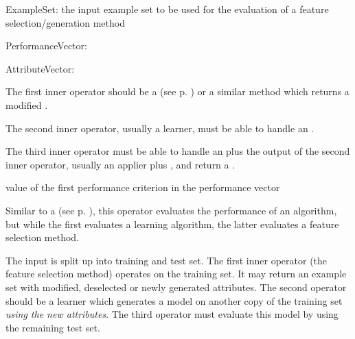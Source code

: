 



\newcommand{\methodvalidationdata}{
\begin{opin}
\item[ExampleSet:] the input example set to be used for the evaluation of a feature selection/generation method
\end{opin}

\begin{opout}
\item[PerformanceVector:]
\item[AttributeVector:]
\end{opout}

\begin{innerops}
\item The first inner operator should be a \op{FeatureOperator} 
(see p. \pageref{sec:op:FeatureOperator}) or a similar method
  which returns a modified \ioobj{ExampleSet}.
\item The second inner operator, usually a learner, must be able to handle an \ioobj{ExampleSet}.
\item The third inner operator must be able to handle an \ioobj{ExampleSet} plus the output of
  the second inner operator, usually an applier plus , and return a .
\end{innerops}
}
\methodvalidationdata

\newcommand{\methodvalidationchainvalues}{
\val[performance] value of the first performance criterion in the
  performance vector
}
\begin{values}
\methodvalidationchainvalues
\end{values}

\opdescr Similar to a  (see p. \pageref{sec:op:ValidationChain}), 
this operator evaluates the performance of an algorithm, 
but while the first evaluates a learning algorithm, 
the latter evaluates a feature selection method. 

The input  is split up into training and test
set. The first inner operator (the feature selection method) operates
on the training set. It may return an example set with modified,
deselected or newly generated attributes. The second operator should
be a learner which generates a model on another copy of the training
set \textit{using the new attributes}. The third operator must
evaluate this model by using the remaining test set.




